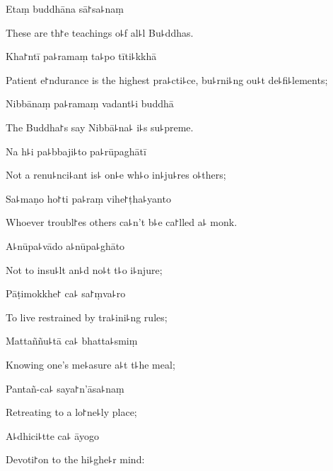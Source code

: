 Etaṃ buddhāna sā꜓sa꜕naṃ

\begin{english}
  These are th꜓e teachings o꜕f al꜕l Bu꜕ddhas.
\end{english}

Kha꜓ntī pa꜕ramaṃ ta꜕po tīti꜕kkhā

\begin{english}
  Patient e꜓ndurance is the highest pra꜕cti꜕ce, bu꜕rni꜕ng ou꜕t de꜕fi꜕lements;
\end{english}

Nibbānaṃ pa꜕ramaṃ vadant꜕i buddhā

\begin{english}
  The Buddha꜓s say Nibbā꜕na꜕ i꜕s su꜕preme.
\end{english}

Na h꜕i pa꜕bbaji꜕to pa꜕rūpaghātī

\begin{english}
  Not a renu꜕nci꜕ant is꜕ on꜕e wh꜕o in꜕ju꜕res o꜕thers;
\end{english}

Sa꜕maṇo ho꜓ti pa꜕raṃ vihe꜓ṭha꜕yanto

\begin{english}
  Whoever troubl꜓es others ca꜕n't b꜕e ca꜓lled a꜕ monk.
\end{english}

\clearpage

A꜕nūpa꜕vādo a꜕nūpa꜕ghāto

\begin{english}
  Not to insu꜕lt an꜕d no꜕t t꜕o i꜕njure;
\end{english}

Pāṭimokkhe꜓ ca꜕ sa꜓ṃva꜕ro

\begin{english}
  To live restrained by tra꜕ini꜕ng rules;
\end{english}

Mattaññu꜕tā ca꜕ bhatta꜕smiṃ

\begin{english}
  Knowing one's me꜕asure a꜕t t꜕he meal;
\end{english}

Pantañ-ca꜕ saya꜓n'āsa꜕naṃ

\begin{english}
  Retreating to a lo꜓ne꜕ly place;
\end{english}

A꜕dhici꜕tte ca꜕ āyogo

\begin{english}
  Devoti꜓on to the hi꜕ghe꜕r mind:
\end{english}

